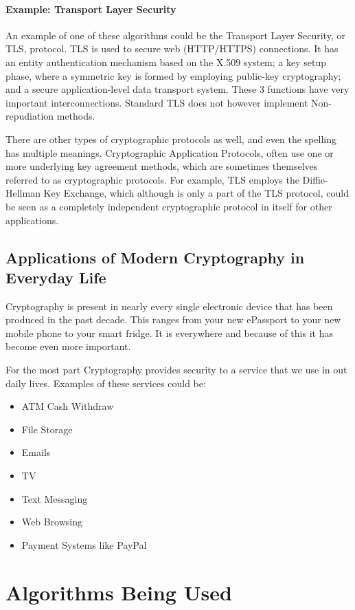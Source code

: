 \paragraph{Example: Transport Layer Security} 
An example of one of these algorithms could be the Transport Layer Security, or TLS, protocol. TLS is used to secure web (HTTP/HTTPS) connections. It has an entity authentication mechanism based on the X.509 system; a key setup phase, where a symmetric key is formed by employing public-key cryptography; and a secure application-level data transport system. These 3 functions have very important interconnections. Standard TLS does not however implement Non-repudiation methods.

There are other types of cryptographic protocols as well, and even the spelling has multiple meanings. Cryptographic Application Protocols, often use one or more underlying key agreement methods, which are sometimes themselves referred to as cryptographic protocols. For example, TLS employs the Diffie-Hellman Key Exchange, which although is only a part of the TLS protocol, could be seen as a completely independent cryptographic protocol in itself for other applications.

\subsection{Applications of Modern Cryptography in Everyday Life}

Cryptography is present in nearly every single electronic device that has been produced in the past decade. This ranges from your new ePassport to your new mobile phone to your smart fridge. It is everywhere and because of this it has become even more important. 

For the most part Cryptography provides security to a service that we use in out daily lives. Examples of these services could be:
\begin{itemize}
\item{ATM Cash Withdraw}
\item{File Storage}
\item{Emails}
\item{TV}
\item{Text Messaging}
\item{Web Browsing}
\item{Payment Systems like PayPal}
\end{itemize}

\section{Algorithms Being Used}

